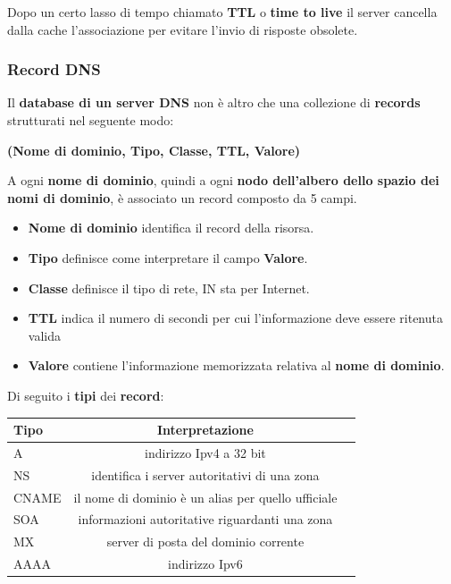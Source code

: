 \documentclass[11pt,a4paper,oneside]{book}
\theoremstyle{definition}
\begin{document}
\pagebreak

Dopo un certo lasso di tempo chiamato \textbf{TTL} o \textbf{time to live} il server cancella dalla cache l'associazione per evitare l'invio di risposte obsolete.

\subsubsection{Record DNS} Il \textbf{database di un  server DNS} non è altro che una collezione di \textbf{records} strutturati nel seguente modo:
\begin{center}
	\textbf{(Nome di dominio, Tipo, Classe, TTL, Valore)}
\end{center}
A ogni \textbf{nome di dominio}, quindi a ogni \textbf{nodo dell'albero dello spazio dei nomi di dominio}, è associato un record composto da 5 campi.
\begin{itemize}
	\item \textbf{Nome di dominio} identifica il record della risorsa.
	\item \textbf{Tipo} definisce come interpretare il campo \textbf{Valore}.
	\item \textbf{Classe} definisce il tipo di rete, IN sta per Internet.
	\item \textbf{TTL} indica il numero di secondi per cui l'informazione deve essere ritenuta valida
	\item \textbf{Valore} contiene l'informazione memorizzata relativa al \textbf{nome di dominio}.
\end{itemize}
Di seguito i \textbf{tipi} dei \textbf{record}:
\begin{table}[h!]
	\begin{center}
		\label{tab:table1}
		\begin{tabular}{l|c|r}
			\textbf{Tipo} & \textbf{Interpretazione}                           \\
			\hline
			A             & indirizzo Ipv4 a 32 bit                            \\
			NS            & identifica i server autoritativi di una zona       \\
			CNAME         & il nome di dominio è un alias per quello ufficiale \\
			SOA           & informazioni autoritative riguardanti una zona     \\
			MX            & server di posta del dominio
			corrente                                                           \\
			AAAA          & indirizzo Ipv6                                     \\
		\end{tabular}
	\end{center}
\end{table}\newline
\end{document}

